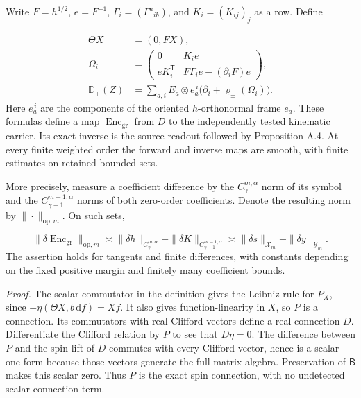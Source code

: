 \documentclass[
  english,
  11pt,
  reqno]{amsart}
\begin{document}
Write \(F=h^{1/2}\), \(e=F^{-1}\), \(\Gamma_i=(\Gamma^a{}_{ib})\), and
\(K_i=(K_{ij})_j\) as a row. Define

\label{eq:online-source-positive-frame-encoding} \[
\begin{aligned}
\Theta X&=(0,FX),\\
\Omega_i&=
\begin{pmatrix}
0&K_i e\\
eK_i^{\mathsf T}&F\Gamma_i e-(\partial_iF)e
\end{pmatrix},\\
\mathbb D_\pm(Z)
&=\sum_{a,i}E_a\otimes e_a^{\,i}
\bigl(\partial_i+\varrho_\pm(\Omega_i)\bigr).
\end{aligned}
\] Here \(e_a^{\,i}\) are the components of the oriented
\(h\)-orthonormal frame \(e_a\). These formulas define a map
\(\operatorname{Enc}_{\mathrm{gr}}\) from \(D\) to the independently
tested kinematic carrier. Its exact inverse is the source readout
followed by Proposition A.4. At every finite weighted order the forward
and inverse maps are smooth, with finite estimates on retained bounded
sets.

More precisely, measure a coefficient difference by the
\(C^{m,\alpha}_\gamma\) norm of its symbol and the
\(C^{m-1,\alpha}_{\gamma-1}\) norms of both zero-order coefficients.
Denote the resulting norm by \(\|\cdot\|_{\mathrm{op},m}\). On such
sets,

\label{eq:online-source-balanced-operator-norm} \[
\|\delta\operatorname{Enc}_{\mathrm{gr}}\|_{\mathrm{op},m}
\asymp
\|\delta h\|_{C^{m,\alpha}_\gamma}
+\|\delta K\|_{C^{m-1,\alpha}_{\gamma-1}}
\asymp \|\delta s\|_{\mathcal X_m}+\|\delta y\|_{\mathcal Y_m}.
\] The assertion holds for tangents and finite differences, with
constants depending on the fixed positive margin and finitely many
coefficient bounds.

\emph{Proof.} The scalar commutator in the definition gives the Leibniz
rule for \(P_X\), since \(-\eta(\Theta X,b\,\mathrm df)=Xf\). It also
gives function-linearity in \(X\), so \(P\) is a connection. Its
commutators with real Clifford vectors define a real connection \(D\).
Differentiate the Clifford relation by \(P\) to see that \(D\eta=0\).
The difference between \(P\) and the spin lift of \(D\) commutes with
every Clifford vector, hence is a scalar one-form because those vectors
generate the full matrix algebra. Preservation of \(\mathsf B\) makes
this scalar zero. Thus \(P\) is the exact spin connection, with no
undetected scalar connection term.
\end{document}
